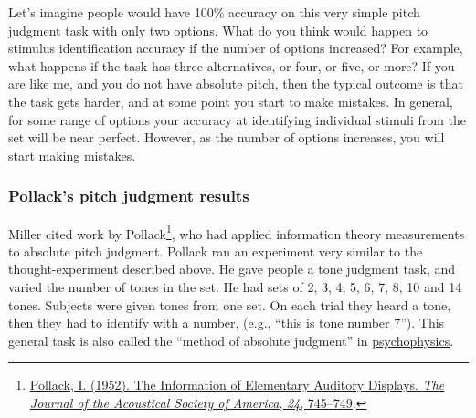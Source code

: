 \documentclass[
  oneside,
  12pt]{crumpbook}
\begin{document}
Let's imagine people would have 100\% accuracy on this very simple pitch judgment task with only two options. What do you think would happen to stimulus identification accuracy if the number of options increased? For example, what happens if the task has three alternatives, or four, or five, or more? If you are like me, and you do not have absolute pitch, then the typical outcome is that the task gets harder, and at some point you start to make mistakes. In general, for some range of options your accuracy at identifying individual stimuli from the set will be near perfect. However, as the number of options increases, you will start making mistakes.

\hypertarget{pollacks-pitch-judgment-results}{%
\subsubsection{Pollack's pitch judgment results}\label{pollacks-pitch-judgment-results}}

Miller cited work by Pollack\footnote{\protect\hyperlink{ref-pollackInformationElementaryAuditory1952a}{Pollack, I. (1952). The {Information} of {Elementary Auditory Displays}. \emph{The Journal of the Acoustical Society of America}, \emph{24}, 745--749}.}, who had applied information theory measurements to absolute pitch judgment. Pollack ran an experiment very similar to the thought-experiment described above. He gave people a tone judgment task, and varied the number of tones in the set. He had sets of 2, 3, 4, 5, 6, 7, 8, 10 and 14 tones. Subjects were given tones from one set. On each trial they heard a tone, then they had to identify with a number, (e.g., ``this is tone number 7''). This general task is also called the ``method of absolute judgment'' in \href{https://en.wikipedia.org/wiki/Psychophysics}{psychophysics}.
\end{document}
